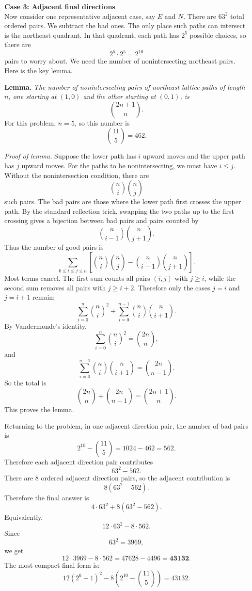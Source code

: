 \documentclass{article}
\begin{document}
\textbf{Case 3: Adjacent final directions} \\
Now consider one representative adjacent case, say $E$ and $N$. There are $63^2$ total ordered pairs. We subtract the bad ones. The only place such paths can intersect is the northeast quadrant. In that quadrant, each path has $2^5$ possible choices, so there are
\[
2^5\cdot 2^5=2^{10}
\]
pairs to worry about. We need the number of nonintersecting northeast pairs. Here is the key lemma.

\vspace{2mm}
\textbf{Lemma.} \textit{The number of nonintersecting pairs of northeast lattice paths of length $n$, one starting at $(1,0)$ and the other starting at $(0,1)$, is}
\[
\binom{2n+1}{n}.
\]
For this problem, $n=5$, so this number is
\[
\binom{11}{5}=462.
\]

\textit{Proof of lemma.} Suppose the lower path has $i$ upward moves and the upper path has $j$ upward moves. For the paths to be nonintersecting, we must have $i\le j$. Without the nonintersection condition, there are
\[
\binom{n}{i}\binom{n}{j}
\]
such pairs. The bad pairs are those where the lower path first crosses the upper path. By the standard reflection trick, swapping the two paths up to the first crossing gives a bijection between bad pairs and pairs counted by
\[
\binom{n}{i-1}\binom{n}{j+1}.
\]
Thus the number of good pairs is
\[
\sum_{0\le i\le j\le n}
\left[
\binom{n}{i}\binom{n}{j} - \binom{n}{i-1}\binom{n}{j+1}
\right].
\]
Most terms cancel. The first sum counts all pairs $(i,j)$ with $j\ge i$, while the second sum removes all pairs with $j\ge i+2$. Therefore only the cases $j=i$ and $j=i+1$ remain:
\[
\sum_{i=0}^{n}\binom{n}{i}^{2}
+
\sum_{i=0}^{n-1}\binom{n}{i}\binom{n}{i+1}.
\]
By Vandermonde's identity,
\[
\sum_{i=0}^{n}\binom{n}{i}^{2} = \binom{2n}{n},
\]
and
\[
\sum_{i=0}^{n-1}\binom{n}{i}\binom{n}{i+1} = \binom{2n}{n-1}.
\]
So the total is
\[
\binom{2n}{n}+\binom{2n}{n-1} = \binom{2n+1}{n}.
\]
This proves the lemma.

\vspace{2mm}
Returning to the problem, in one adjacent direction pair, the number of bad pairs is
\[
2^{10}-\binom{11}{5} = 1024-462 = 562.
\]
Therefore each adjacent direction pair contributes
\[
63^2-562.
\]
There are $8$ ordered adjacent direction pairs, so the adjacent contribution is
\[
8(63^2-562).
\]
Therefore the final answer is
\[
4\cdot 63^2+8(63^2-562).
\]
Equivalently,
\[
12\cdot 63^2-8\cdot 562.
\]
Since
\[
63^2=3969,
\]
we get
\[
12\cdot 3969-8\cdot 562 = 47628-4496 = \mathbf{43132}.
\]
The most compact final form is:
\[
\boxed{
12(2^6-1)^2 - 8\left(2^{10}-\binom{11}{5}\right) = 43132
}.
\]
\end{document}
